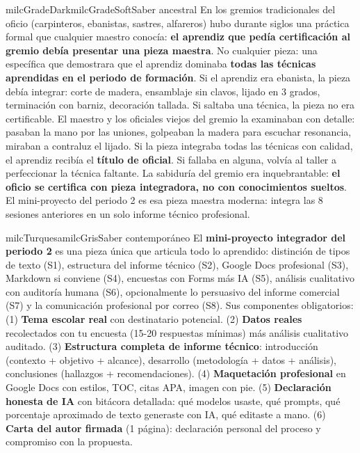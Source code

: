 \documentclass[11pt,letterpaper]{article}
\begin{document}
\begin{softbox}{milcGradeDark}{milcGradeSoft}{Saber ancestral}
En los gremios tradicionales del oficio (carpinteros, ebanistas, sastres, alfareros) hubo durante siglos una práctica formal que cualquier maestro conocía: \textbf{el aprendiz que pedía certificación al gremio debía presentar una pieza maestra}. No cualquier pieza: una específica que demostrara que el aprendiz dominaba \textbf{todas las técnicas aprendidas en el periodo de formación}. Si el aprendiz era ebanista, la pieza debía integrar: corte de madera, ensamblaje sin clavos, lijado en 3 grados, terminación con barniz, decoración tallada. Si saltaba una técnica, la pieza no era certificable. El maestro y los oficiales viejos del gremio la examinaban con detalle: pasaban la mano por las uniones, golpeaban la madera para escuchar resonancia, miraban a contraluz el lijado. Si la pieza integraba todas las técnicas con calidad, el aprendiz recibía el \textbf{título de oficial}. Si fallaba en alguna, volvía al taller a perfeccionar la técnica faltante. La sabiduría del gremio era inquebrantable: \textbf{el oficio se certifica con pieza integradora, no con conocimientos sueltos}. El mini-proyecto del periodo 2 es esa pieza maestra moderna: integra las 8 sesiones anteriores en un solo informe técnico profesional.
\end{softbox}

\begin{softbox}{milcTurquesa}{milcGris}{Saber contemporáneo}
El \textbf{mini-proyecto integrador del periodo 2} es una pieza única que articula todo lo aprendido: distinción de tipos de texto (S1), estructura del informe técnico (S2), Google Docs profesional (S3), Markdown si conviene (S4), encuestas con Forms más IA (S5), análisis cualitativo con auditoría humana (S6), opcionalmente lo persuasivo del informe comercial (S7) y la comunicación profesional por correo (S8). Sus componentes obligatorios: (1) \textbf{Tema escolar real} con destinatario potencial. (2) \textbf{Datos reales} recolectados con tu encuesta (15-20 respuestas mínimas) más análisis cualitativo auditado. (3) \textbf{Estructura completa de informe técnico}: introducción (contexto + objetivo + alcance), desarrollo (metodología + datos + análisis), conclusiones (hallazgos + recomendaciones). (4) \textbf{Maquetación profesional} en Google Docs con estilos, TOC, citas APA, imagen con pie. (5) \textbf{Declaración honesta de IA} con bitácora detallada: qué modelos usaste, qué prompts, qué porcentaje aproximado de texto generaste con IA, qué editaste a mano. (6) \textbf{Carta del autor firmada} (1 página): declaración personal del proceso y compromiso con la propuesta.
\end{softbox}
\end{document}
